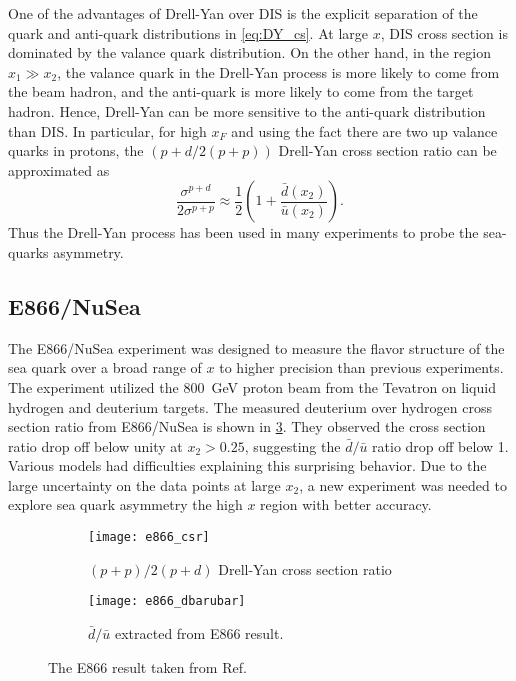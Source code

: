 \documentclass[../main.tex]{subfiles}
\begin{document}
One of the advantages of Drell-Yan over DIS is the explicit separation of the quark
and anti-quark distributions in \cref{eq:DY_cs}. At large $x$, DIS cross section
is dominated by the valance quark distribution. On the other hand, in the region $x_1 \gg x_2$,
the valance quark in the Drell-Yan process is more likely to come from the beam
hadron, and the anti-quark is more likely to come from the target hadron. Hence,
Drell-Yan can be more sensitive to the anti-quark distribution than DIS. In
particular, for high $x_F$ and using the fact there are two up valance quarks in
protons, the $(p+d/2(p+p))$ Drell-Yan cross section ratio can be approximated as
\begin{equation}
	\frac{\sigma^{p+d}}{2\sigma^{p+p}} \approx \frac{1}{2} \left( 1+ \frac{\bar{d}\left(x_2\right)}{\bar{u}\left(x_2\right)} \right).
\end{equation}
Thus the Drell-Yan process has been used in many experiments to probe the sea-quarks
asymmetry.


\subsection{E866/NuSea}
\label{sec:E866}
The E866/NuSea experiment was designed to measure the flavor structure of the sea
quark over a broad range of $x$ to higher precision than previous experiments. The
experiment utilized the \SI{800}{\GeV} proton beam from the Tevatron on liquid
hydrogen and deuterium targets. The measured deuterium over hydrogen cross section
ratio from E866/NuSea is shown in \cref{fig:e866_result}. They observed the
cross section ratio drop off below unity at $x_2>0.25$, suggesting the $\bar{d}/\bar{u}$
ratio drop off below 1. Various models had difficulties explaining this surprising
behavior. Due to the large uncertainty on the data points at large $x_2$, a new
experiment was needed to explore sea quark asymmetry the high $x$ region with better
accuracy.
\begin{figure}[htbp!]
	\centering
	\begin{subfigure}{0.45\linewidth}
		\texttt{[image: e866\_csr]}
		\caption{$(p+p)/2(p+d)$ Drell-Yan cross section ratio}
		\label{subfig:e866_csr}
	\end{subfigure}
	\begin{subfigure}{0.45\linewidth}
		\texttt{[image: e866\_dbarubar]}
		\caption{$\bar{d}/\bar{u}$ extracted from E866 result.}
		\label{subfig:e866_dbarubar}
	\end{subfigure}
	\caption{The E866 result taken from Ref.~\cite{towell2001}}
	\label{fig:e866_result}
\end{figure}
\end{document}
